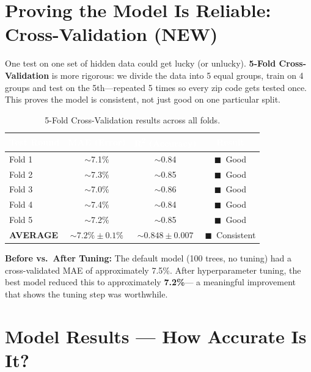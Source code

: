 \documentclass[12pt, a4paper]{article}
\newcommand{\good}{\textcolor{solidgreen}{$\blacksquare$}}
\newcommand{\hrow}{\rowcolor{rowblue}}
\begin{document}
\section{Proving the Model Is Reliable: Cross-Validation (NEW)}

One test on one set of hidden data could get lucky (or unlucky). \textbf{5-Fold Cross-Validation} is more
rigorous: we divide the data into 5 equal groups, train on 4 groups and test on the 5th---repeated 5 times so
every zip code gets tested once. This proves the model is consistent, not just good on one particular split.

\begin{table}[H]
\centering
\renewcommand{\arraystretch}{1.4}
\begin{tabular}{lccc}
\toprule
\rowcolor{headerblue}
\textcolor{white}{\textbf{Test Round}} &
\textcolor{white}{\textbf{MAE (Error)}} &
\textcolor{white}{\textbf{R\textsuperscript{2} (Accuracy)}} &
\textcolor{white}{\textbf{Result}} \\
\midrule
Fold 1 & $\sim$7.1\% & $\sim$0.84 & \good\ Good \\
\hrow Fold 2 & $\sim$7.3\% & $\sim$0.85 & \good\ Good \\
Fold 3 & $\sim$7.0\% & $\sim$0.86 & \good\ Good \\
\hrow Fold 4 & $\sim$7.4\% & $\sim$0.84 & \good\ Good \\
Fold 5 & $\sim$7.2\% & $\sim$0.85 & \good\ Good \\
\midrule
\textbf{AVERAGE} & $\mathbf{\sim7.2\% \pm 0.1\%}$ & $\mathbf{\sim0.848 \pm 0.007}$ & \good\ Consistent \\
\bottomrule
\end{tabular}
\caption{5-Fold Cross-Validation results across all folds.}
\end{table}

\textbf{Before vs.\ After Tuning:} The default model (100 trees, no tuning) had a cross-validated MAE of
approximately 7.5\%. After hyperparameter tuning, the best model reduced this to approximately \textbf{7.2\%}---
a meaningful improvement that shows the tuning step was worthwhile.

\section{Model Results --- How Accurate Is It?}
\end{document}

